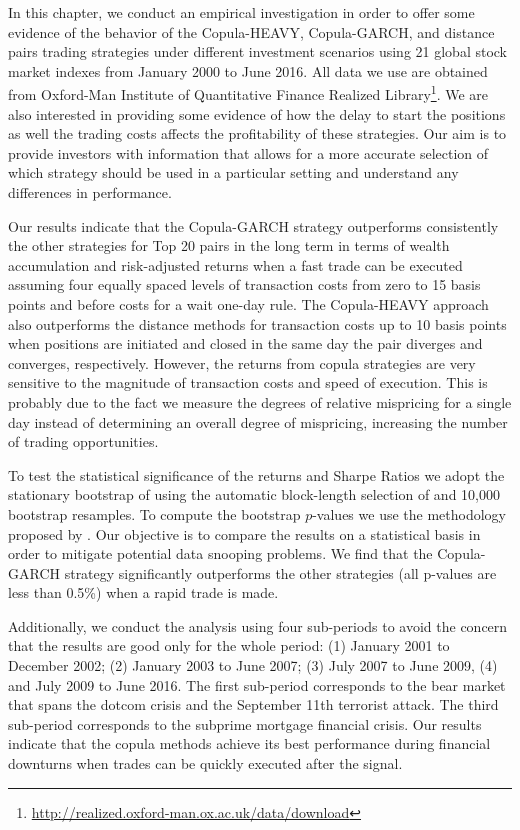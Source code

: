 \documentclass[a4paper,12pt]{report}
\begin{document}
In this chapter, we conduct an empirical investigation in order to offer some evidence of the behavior of the Copula-HEAVY, Copula-GARCH, and distance pairs trading strategies under different investment scenarios using 21 global stock market indexes from January 2000 to June 2016. All data we use are obtained from Oxford-Man Institute of Quantitative Finance Realized Library\footnote{\url{http://realized.oxford-man.ox.ac.uk/data/download}}. We are also interested in providing some evidence of how the delay to start the positions as well the trading costs affects the profitability of these strategies. Our aim is to provide investors with information that allows for a more accurate selection of which strategy should be used in a particular setting and understand any differences in performance.

Our results indicate that the Copula-GARCH strategy outperforms consistently the other strategies for Top 20 pairs in the long term in terms of wealth accumulation and risk-adjusted returns when a fast trade can be executed assuming four equally spaced levels of transaction costs from zero to 15 basis points and before costs for a wait one-day rule. The Copula-HEAVY approach also outperforms the distance methods for transaction costs up to 10 basis points when positions are initiated and closed in the same day the pair diverges and converges, respectively. However, the returns from copula strategies are very sensitive to the magnitude of transaction costs and speed of execution. This is probably due to the fact we measure the degrees of relative mispricing for a single day instead of determining an overall degree of mispricing, increasing the number of trading opportunities.

To test the statistical significance of the returns and Sharpe Ratios we adopt the stationary bootstrap of \citet*{pr94} using the automatic block-length selection of \citet*{pw04} and 10,000 bootstrap resamples. To compute the bootstrap $p$-values we use the methodology proposed by \citet*{lw08}. Our objective is to compare the results on a statistical basis in order to mitigate potential data snooping problems. We find that the Copula-GARCH strategy significantly outperforms the other strategies (all p-values are less than 0.5\%) when a rapid trade is made.

Additionally, we conduct the analysis using four sub-periods to avoid the concern that the results are good only for the whole period: (1) January 2001 to December 2002; (2) January 2003 to June 2007; (3) July 2007 to June 2009, (4) and July 2009 to June 2016. The first sub-period corresponds to the bear market that spans the dotcom crisis and the September 11th terrorist attack. The third sub-period corresponds to the subprime mortgage financial crisis. Our results indicate that the copula methods achieve its best performance during financial downturns when trades can be quickly executed after the signal.
\end{document}
